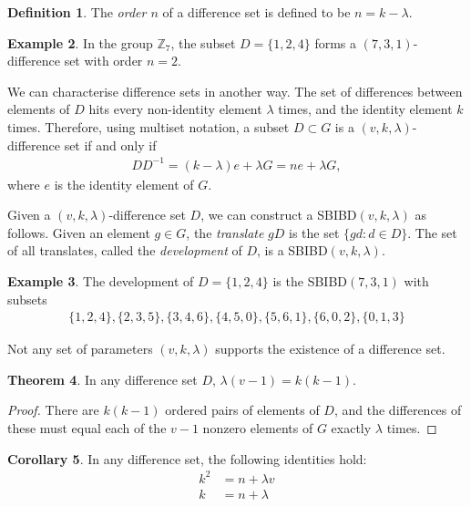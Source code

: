\documentclass[12pt,a4paper]{article}
\theoremstyle{definition}
\newtheorem{theorem}{Theorem}[section]
\newtheorem{corollary}[theorem]{Corollary}
\newtheorem{example}[theorem]{Example}
\newtheorem{definition}[theorem]{Definition}
\begin{document}
\begin{definition}
The \emph{order $n$} of a difference set is defined to be $n = k - \lambda$.
\end{definition}

\begin{example}
In the group $\mathbb{Z}_7$, the subset $D = \{1, 2, 4\}$ forms a $(7, 3, 1)$-difference set with order $n=2$.
\end{example}

We can characterise difference sets in another way. The set of differences between elements of $D$ hits every non-identity element $\lambda$ times, and the identity element $k$ times. Therefore, using multiset notation, a subset $D \subset G$ is a $(v, k, \lambda)$-difference set if and only if
\begin{align*}
DD^{-1} = (k-\lambda) e + \lambda G = n e + \lambda G,
\end{align*}
where $e$ is the identity element of $G$. 

Given a $(v, k, \lambda)$-difference set $D$, we can construct a SBIBD$(v, k, \lambda)$ as follows. Given an element $g \in G$, the \emph{translate} $gD$ is the set $\{gd : d \in D\}$. The set of all translates, called the \emph{development} of $D$, is a SBIBD$(v, k, \lambda)$.

\begin{example}
The development of $D = \{1, 2, 4\}$ is the SBIBD$(7, 3, 1)$ with subsets
\begin{align*}
\{1,2,4\}, \{2,3,5\}, \{3,4,6\}, \{4,5,0\}, \{5,6,1\}, \{6,0,2\}, \{0,1,3\}
\end{align*}
\end{example}

Not any set of parameters $(v, k, \lambda)$ supports the existence of a difference set.

\begin{theorem}
In any difference set $D$, $\lambda(v-1) = k(k-1)$.
\end{theorem}
\begin{proof}
There are $k(k-1)$ ordered pairs of elements of $D$, and the differences of these must equal each of the $v-1$ nonzero elements of $G$ exactly $\lambda$ times.
\end{proof}

\begin{corollary}
\label{k-identities}
In any difference set, the following identities hold:
\begin{align*}
k^2 &= n + \lambda v \\
k &= n + \lambda
\end{align*}
\end{corollary}
\end{document}
